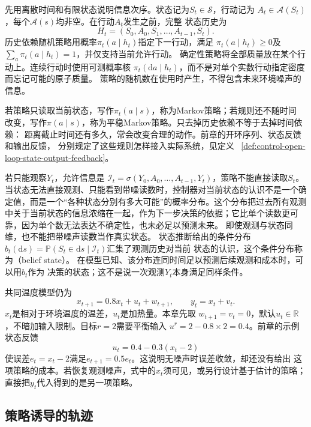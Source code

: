 先用离散时间和有限状态说明信息次序。状态记为$S_t\in\mathcal S$，行动记为
$A_t\in\mathcal A(S_t)$，每个$\mathcal A(s)$均非空。在行动$A_t$发生之前，完整
状态历史为
\[
  H_t=(S_0,A_0,S_1,\ldots,A_{t-1},S_t).
\]
历史依赖随机策略用概率$\pi_t(a\mid h_t)$指定下一行动，满足
$\pi_t(a\mid h_t)\geq0$及$\sum_a\pi_t(a\mid h_t)=1$，并仅支持当前允许行动。
确定性策略将全部质量放在某个行动上。连续行动时使用可测概率核
$\pi_t(\mathrm da\mid h_t)$，而不是对单个实数行动指定密度而忘记可能的原子质量。
策略的随机数在使用时产生，不得包含未来环境噪声的信息。

若策略只读取当前状态，写作$\pi_t(a\mid s)$，称为Markov策略；若规则还不随时间
改变，写作$\pi(a\mid s)$，称为平稳Markov策略。只去掉历史依赖不等于去掉时间依赖：
距离截止时间还有多久，常会改变合理的动作。前章的开环序列、状态反馈和输出反馈，
分别规定了这些规则怎样接入实际系统，见定义
~\ref{def:control-open-loop-state-output-feedback}。

若只能观察$Y_t$，允许信息是
$\mathcal I_t=\sigma(Y_0,A_0,\ldots,A_{t-1},Y_t)$，策略不能直接读取$S_t$。
当状态无法直接观测、只能看到带噪读数时，控制器对当前状态的认识不是一个确定值，而是一个“各种状态分别有多大可能”的概率分布。这个分布把过去所有观测中关于当前状态的信息浓缩在一起，作为下一步决策的依据；它比单个读数更可靠，因为单个数无法表达不确定性，也未必足以预测未来。
即使观测与状态同维，也不能把带噪声读数当作真实状态。
状态推断给出的条件分布
$b_t(\mathrm ds)=\mathbb P(S_t\in\mathrm ds\mid\mathcal I_t)$汇集了观测历史对当前
状态的认识，这个条件分布称为（belief state）。
在模型已知、该分布连同时间足以预测后续观测和成本时，可以用$b_t$作为
决策的状态；这不是说一次观测$Y_t$本身满足同样条件。

共同温度模型仍为
\begin{equation}
  x_{t+1}=0.8x_t+u_t+w_{t+1},
  \qquad y_t=x_t+v_t.
  \label{eq:policy-temperature-model}
\end{equation}
$x_t$是相对于环境温度的温差，$u_t$是加热量。本章先取
$w_{t+1}=v_t=0$，默认$u_t\in\mathbb R$，不暗加输入限制。目标$r=2$需要平衡输入
$u^r=2-0.8\times2=0.4$。前章的示例状态反馈
\begin{equation}
  u_t=0.4-0.3(x_t-2)
  \label{eq:policy-temperature-feedback}
\end{equation}
使误差$e_t=x_t-2$满足$e_{t+1}=0.5e_t$。这说明无噪声时误差收敛，却还没有给出
这项策略的成本。若恢复观测噪声，式中的$x_t$须可见，或另行设计基于估计的策略；
直接把$y_t$代入得到的是另一项策略。

\subsection{策略诱导的轨迹}
\label{sec:policy-induced-trajectories}

